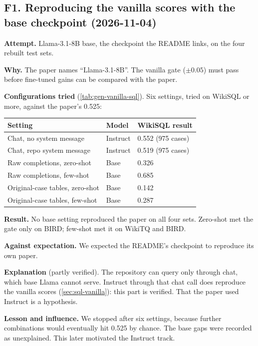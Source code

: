 \subsection{F1. Reproducing the vanilla scores with the base checkpoint (2026-11-04)}\label{sec:fail-gate}
\begin{failbox}{}
\textbf{Attempt.} Llama-3.1-8B base, the checkpoint the README links, on the four rebuilt test sets.

\textbf{Why.} The paper names ``Llama-3.1-8B''. The vanilla gate ($\pm0.05$) must pass before fine-tuned gains can be
compared with the paper.

\textbf{Configurations tried} (\cref{tab:gen-vanilla-sql}). Six settings, tried on WikiSQL or more, against the
paper's 0.525:

{\small
{}
\begin{tabular}{@{}lll@{}}
\toprule\rowcolor{headshade}Setting & Model & WikiSQL result\\\midrule
Chat, no system message & Instruct & 0.552 (975 cases)\\
Chat, repo system message & Instruct & 0.519 (975 cases)\\
Raw completions, zero-shot & Base & 0.326\\
Raw completions, few-shot & Base & 0.685\\
Original-case tables, zero-shot & Base & 0.142\\
Original-case tables, few-shot & Base & 0.287\\
\bottomrule
\end{tabular}
}

\textbf{Result.} No base setting reproduced the paper on all four sets. Zero-shot met the gate only on BIRD; few-shot
met it on WikiTQ and BIRD.

\textbf{Against expectation.} We expected the README's checkpoint to reproduce its own paper.

\textbf{Explanation} (partly verified). The repository can query only through chat, which base Llama cannot serve.
Instruct through that chat call does reproduce the vanilla scores (\cref{sec:sql-vanilla}): this part is verified.
That the paper used Instruct is a hypothesis.

\textbf{Lesson and influence.} We stopped after six settings, because further combinations would eventually hit 0.525
by chance. The base gaps were recorded as unexplained. This later motivated the Instruct track.
\end{failbox}

